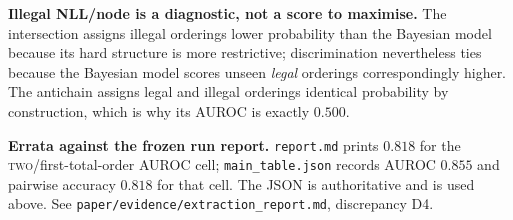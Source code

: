 \begin{landscape}
\begin{table}[p]
\begin{minipage}{0.98\linewidth}
\textbf{Illegal NLL/node is a diagnostic, not a score to maximise.} The
intersection assigns illegal orderings lower probability than the Bayesian model
because its hard structure is more restrictive; discrimination nevertheless ties
because the Bayesian model scores unseen \emph{legal} orderings correspondingly
higher. The antichain assigns legal and illegal orderings identical probability
by construction, which is why its AUROC is exactly $0.500$.

\textbf{Errata against the frozen run report.}
\texttt{report.md} prints $0.818$ for the \textsc{two}/first-total-order AUROC
cell; \texttt{main\_table.json} records AUROC $0.855$ and pairwise accuracy
$0.818$ for that cell. The JSON is authoritative and is used above. See
\texttt{paper/evidence/extraction\_report.md}, discrepancy D4.
\end{minipage}
\end{table}
\end{landscape}
